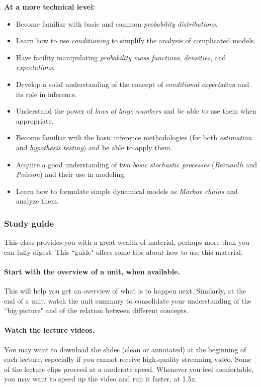 \documentclass[pdftex, brazil, 12pt, twoside]{article}
\begin{document}
\textbf{At a more technical level:}

\begin{itemize}[noitemsep]
\item Become familiar with basic and common \emph{probability distributions}.
\item Learn how to use \emph{conditioning} to simplify the analysis of complicated models.
\item Have facility manipulating \emph{probability mass functions}, \emph{densities}, and \emph{expectations}.
\item Develop a solid understanding of the concept of \emph{conditional expectation} and its role in inference.
\item Understand the power of \emph{laws of large numbers} and be able to use them when appropriate.
\item Become familiar with the basic inference methodologies (for both \emph{estimation} and \emph{hypothesis testing}) and be able to apply them.
\item Acquire a good understanding of two \emph{basic stochastic processes} (\emph{Bernoulli} and \emph{Poisson}) and their use in modeling.
\item Learn how to formulate simple dynamical models as \emph{Markov chains} and analyze them.
\end{itemize}

\subsubsection{Study guide}
\label{ovw0-ci-sg}

This class provides you with a great wealth of material, perhaps more than you can
fully digest. This “guide" offers some tips about how to use this material.

\paragraph{Start with the overview of a unit, when available.} This will help you
get an overview of what is to happen next. Similarly, at the end of a unit, watch
the unit summary to consolidate your understanding of the “big picture" and of the
relation between different concepts.

\paragraph{Watch the lecture videos.} You may want to download the slides (clean
or annotated) at the beginning of each lecture, especially if you cannot receive
high-quality streaming video. Some of the lecture clips proceed at a moderate speed.
Whenever you feel comfortable, you may want to speed up the video and run it faster, at 1.5x.
\end{document}
